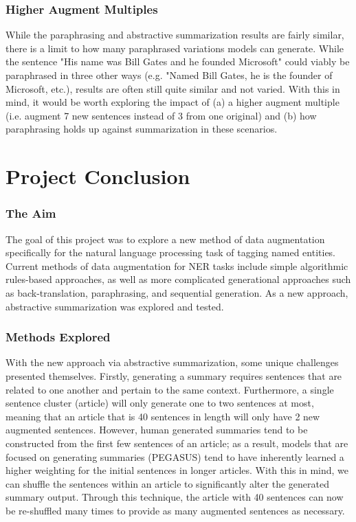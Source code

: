\documentclass[12pt]{report}
\begin{document}
    \subsubsection{Higher Augment Multiples}
        While the paraphrasing and abstractive summarization results are fairly similar, there is a limit to how many paraphrased variations models can generate. While the sentence "His name was Bill Gates and he founded Microsoft" could viably be paraphrased in three other ways (e.g. "Named Bill Gates, he is the founder of Microsoft, etc.), results are often still quite similar and not varied. With this in mind, it would be worth exploring the impact of (a) a higher augment multiple (i.e. augment 7 new sentences instead of 3 from one original) and (b) how paraphrasing holds up against summarization in these scenarios.
    
\section{Project Conclusion}
    
    \subsubsection{The Aim}
    The goal of this project was to explore a new method of data augmentation specifically for the natural language processing task of tagging named entities. Current methods of data augmentation for NER tasks include simple algorithmic rules-based approaches, as well as more complicated generational approaches such as back-translation, paraphrasing, and sequential generation. As a new approach, abstractive summarization was explored and tested.
    
    \subsubsection{Methods Explored}
    With the new approach via abstractive summarization, some unique challenges presented themselves. Firstly, generating a summary requires sentences that are related to one another and pertain to the same context. Furthermore, a single sentence cluster (article) will only generate one to two sentences at most, meaning that an article that is 40 sentences in length will only have 2 new augmented sentences. However, human generated summaries tend to be constructed from the first few sentences of an article; as a result, models that are focused on generating summaries (PEGASUS) tend to have inherently learned a higher weighting for the initial sentences in longer articles. With this in mind, we can shuffle the sentences within an article to significantly alter the generated summary output. Through this technique, the article with 40 sentences can now be re-shuffled many times to provide as many augmented sentences as necessary.
    
\end{document}
